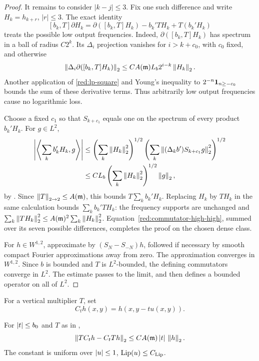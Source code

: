 \begin{proof}
It remains to consider \(|k-j|\le3\). Fix one such difference and
write \(H_k=h_{k+r}\), \(|r|\le3\). The exact identity
\begin{equation}\label{red:commutator-high-high}
 [b_k,T]\partial H_k
  =\partial([b_k,T]H_k)-b_k'TH_k+T(b_k'H_k)
\end{equation}
treats the possible low output frequencies. Indeed,
\(\partial([b_k,T]H_k)\) has spectrum in a ball of radius
\(C2^k\). Its \(\Delta_i\) projection vanishes for
\(i>k+c_0\), with \(c_0\) fixed, and otherwise
\[
 \left\|\Delta_i\partial([b_k,T]H_k)\right\|_2
    \le C A(\mathfrak m)L_b2^{i-k}\left\|H_k\right\|_2.
\]
Another application of \eqref{red:lp-square} and Young's inequality
to \(2^{-n}\mathbf 1_{n\ge-c_0}\) bounds the sum of these derivative
terms. Thus arbitrarily low output frequencies cause no logarithmic
loss.

Choose a fixed \(c_1\) so that \(S_{k+c_1}\) equals one on the
spectrum of every product \(b_k'H_k\). For \(g\in L^2\),
\[
 \begin{split}
 \left|\left\langle\sum_k b_k'H_k,g\right\rangle\right|
 &\le
 \left(\sum_k\left\|H_k\right\|_2^2\right)^{1/2}
 \left(\sum_k\left\|(\Delta_kb')S_{k+c_1}g\right\|_2^2\right)^{1/2}\\
 &\le C L_b
       \left(\sum_k\left\|H_k\right\|_2^2\right)^{1/2}\left\|g\right\|_2,
 \end{split}
\]
by . Since \(\left\|T\right\|_{2\to2}\le A(\mathfrak m)\),
this bounds \(T\sum_k b_k'H_k\). Replacing \(H_k\) by \(TH_k\)
in the same calculation bounds \(\sum_k b_k'TH_k\): the frequency
supports are unchanged and
\(\sum_k\left\|TH_k\right\|_2^2\le A(\mathfrak m)^2
\sum_k\left\|H_k\right\|_2^2\). Equation~\eqref{red:commutator-high-high},
summed over its seven possible differences, completes the proof on
the chosen dense class.

For \(h\in W^{1,2}\), approximate by
\((S_N-S_{-N})h\), followed if necessary by smooth compact Fourier
approximations away from zero. The approximation converges in
\(W^{1,2}\). Since \(b\) is bounded and \(T\) is \(L^2\)-bounded,
the defining commutators converge in \(L^2\). The estimate passes
to the limit, and then defines a bounded operator on all of \(L^2\).
\end{proof}

For a vertical multiplier \(T\), set
\[
 C_t h(x,y)=h(x,y-tu(x,y)).
\]

\begin{corollary}\label{red:composition-commutator}
For \(\left|t\right|\le b_0\) and \(T\) as in ,
\begin{equation}\label{red:composition-bound}
 \left\|TC_t h-C_tTh\right\|_2
      \le C A(\mathfrak m)\left|t\right|\,\left\|h\right\|_2.
\end{equation}
The constant is uniform over \(\left|u\right|\le1\),
\(\operatorname{Lip}(u)\le C_{\rm Lip}\).
\end{corollary}

